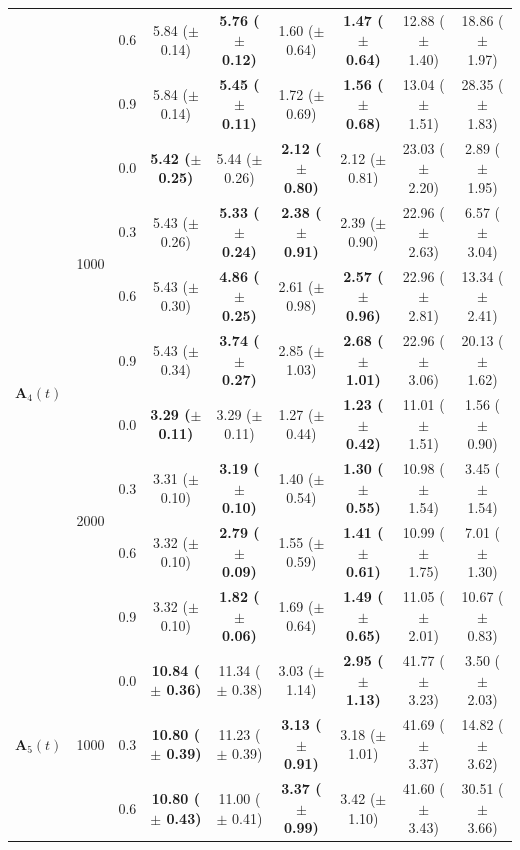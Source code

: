 \begin{table}[htbp]
{\begin{tabular}{lll|cc|cc|cc}
 &  & 0.6 & 5.84 ($\pm$ 0.14) & \textbf{5.76 ($\pm$ 0.12)} & 1.60 ($\pm$ 0.64) & \textbf{1.47 ($\pm$ 0.64)} & 12.88 ($\pm$ 1.40) & 18.86 ($\pm$ 1.97) \\
 &  & 0.9 & 5.84 ($\pm$ 0.14) & \textbf{5.45 ($\pm$ 0.11)} & 1.72 ($\pm$ 0.69) & \textbf{1.56 ($\pm$ 0.68)} & 13.04 ($\pm$ 1.51) & 28.35 ($\pm$ 1.83) \\
\hline
\multirow{8}{*}{$\mathbf{A}_4(t)$} & \multirow{4}{*}{1000} & 0.0 & \textbf{5.42 ($\pm$ 0.25)} & 5.44 ($\pm$ 0.26) & \textbf{2.12 ($\pm$ 0.80)} & 2.12 ($\pm$ 0.81) & 23.03 ($\pm$ 2.20) & 2.89 ($\pm$ 1.95) \\
 &  & 0.3 & 5.43 ($\pm$ 0.26) & \textbf{5.33 ($\pm$ 0.24)} & \textbf{2.38 ($\pm$ 0.91)} & 2.39 ($\pm$ 0.90) & 22.96 ($\pm$ 2.63) & 6.57 ($\pm$ 3.04) \\
 &  & 0.6 & 5.43 ($\pm$ 0.30) & \textbf{4.86 ($\pm$ 0.25)} & 2.61 ($\pm$ 0.98) & \textbf{2.57 ($\pm$ 0.96)} & 22.96 ($\pm$ 2.81) & 13.34 ($\pm$ 2.41) \\
 &  & 0.9 & 5.43 ($\pm$ 0.34) & \textbf{3.74 ($\pm$ 0.27)} & 2.85 ($\pm$ 1.03) & \textbf{2.68 ($\pm$ 1.01)} & 22.96 ($\pm$ 3.06) & 20.13 ($\pm$ 1.62) \\
\cline{2-9}
 & \multirow{4}{*}{2000} & 0.0 & \textbf{3.29 ($\pm$ 0.11)} & 3.29 ($\pm$ 0.11) & 1.27 ($\pm$ 0.44) & \textbf{1.23 ($\pm$ 0.42)} & 11.01 ($\pm$ 1.51) & 1.56 ($\pm$ 0.90) \\
 &  & 0.3 & 3.31 ($\pm$ 0.10) & \textbf{3.19 ($\pm$ 0.10)} & 1.40 ($\pm$ 0.54) & \textbf{1.30 ($\pm$ 0.55)} & 10.98 ($\pm$ 1.54) & 3.45 ($\pm$ 1.54) \\
 &  & 0.6 & 3.32 ($\pm$ 0.10) & \textbf{2.79 ($\pm$ 0.09)} & 1.55 ($\pm$ 0.59) & \textbf{1.41 ($\pm$ 0.61)} & 10.99 ($\pm$ 1.75) & 7.01 ($\pm$ 1.30) \\
 &  & 0.9 & 3.32 ($\pm$ 0.10) & \textbf{1.82 ($\pm$ 0.06)} & 1.69 ($\pm$ 0.64) & \textbf{1.49 ($\pm$ 0.65)} & 11.05 ($\pm$ 2.01) & 10.67 ($\pm$ 0.83) \\
\hline
\multirow{8}{*}{$\mathbf{A}_5(t)$} & \multirow{4}{*}{1000} & 0.0 & \textbf{10.84 ($\pm$ 0.36)} & 11.34 ($\pm$ 0.38) & 3.03 ($\pm$ 1.14) & \textbf{2.95 ($\pm$ 1.13)} & 41.77 ($\pm$ 3.23) & 3.50 ($\pm$ 2.03) \\
 &  & 0.3 & \textbf{10.80 ($\pm$ 0.39)} & 11.23 ($\pm$ 0.39) & \textbf{3.13 ($\pm$ 0.91)} & 3.18 ($\pm$ 1.01) & 41.69 ($\pm$ 3.37) & 14.82 ($\pm$ 3.62) \\
 &  & 0.6 & \textbf{10.80 ($\pm$ 0.43)} & 11.00 ($\pm$ 0.41) & \textbf{3.37 ($\pm$ 0.99)} & 3.42 ($\pm$ 1.10) & 41.60 ($\pm$ 3.43) & 30.51 ($\pm$ 3.66) \\

\end{tabular}}
\end{table}
